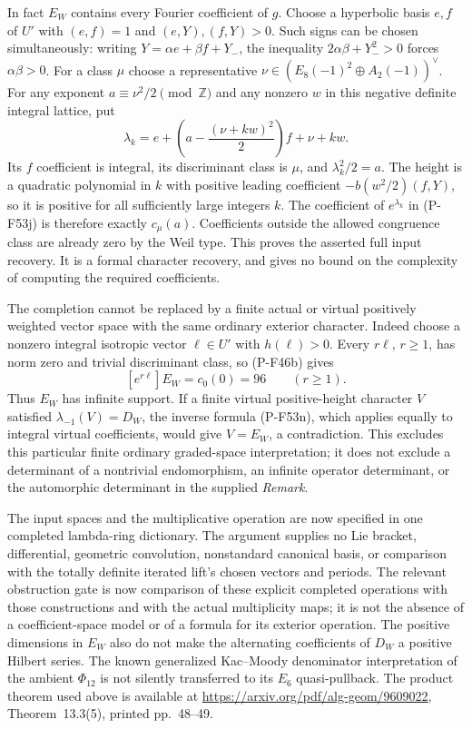 \documentclass[11pt,a4paper]{article}
\begin{document}
In fact $E_W$ contains every Fourier coefficient of $g$.
Choose a hyperbolic basis $e,f$ of $U'$ with
$(e,f)=1$ and $(e,Y),(f,Y)>0$. Such signs can be chosen
simultaneously: writing $Y=\alpha e+\beta f+Y_-$,
the inequality $2\alpha\beta+Y_-^2>0$ forces
$\alpha\beta>0$. For a class $\mu$ choose a representative
$\nu\in (E_8(-1)^2\oplus A_2(-1))^\vee$.
For any exponent $a\equiv\nu^2/2\pmod{\mathbb Z}$ and
any nonzero $w$ in this negative definite integral lattice,
put
\[
 \lambda_k=e+
       \left(a-\frac{(\nu+kw)^2}{2}\right)f+\nu+kw.
 \tag{P-F53o}
\]
Its $f$ coefficient is integral, its discriminant class
is $\mu$, and $\lambda_k^2/2=a$.
The height is a quadratic polynomial in $k$ with positive
leading coefficient $-b(w^2/2)(f,Y)$, so it is positive
for all sufficiently large integers $k$.
The coefficient of $e^{\lambda_k}$ in (P-F53j) is
therefore exactly $c_\mu(a)$. Coefficients outside the
allowed congruence class are already zero by the Weil type.
This proves the asserted full input recovery. It is a
formal character recovery, and gives no bound on the
complexity of computing the required coefficients.

The completion cannot be replaced by a finite actual
or virtual positively weighted vector space with the
same ordinary exterior character. Indeed choose a
nonzero integral isotropic vector $\ell\in U'$ with
$h(\ell)>0$. Every $r\ell$, $r\ge1$, has norm zero
and trivial discriminant class, so (P-F46b) gives
\[
       [e^{r\ell}]E_W=c_0(0)=96\qquad(r\ge1).
 \tag{P-F53p}
\]
Thus $E_W$ has infinite support. If a finite virtual
positive-height character $V$ satisfied
$\lambda_{-1}(V)=D_W$, the inverse formula (P-F53n),
which applies equally to integral virtual coefficients,
would give $V=E_W$, a contradiction. This excludes this
particular finite ordinary graded-space interpretation;
it does not exclude a determinant of a nontrivial
endomorphism, an infinite operator determinant, or the
automorphic determinant in the supplied \emph{Remark}.

The input spaces and the multiplicative operation are
now specified in one completed lambda-ring dictionary.
The argument supplies no Lie bracket, differential,
geometric convolution, nonstandard canonical basis,
or comparison with the totally definite iterated lift's
chosen vectors and periods. The relevant obstruction
gate is now comparison of these explicit completed
operations with those constructions and with the
actual multiplicity maps; it is not the absence of a
coefficient-space model or of a formula for its exterior
operation. The positive dimensions in $E_W$ also do not
make the alternating coefficients of $D_W$ a positive
Hilbert series. The known generalized Kac--Moody
denominator interpretation of the ambient $\Phi_{12}$
is not silently transferred to its $E_6$ quasi-pullback.
The product theorem used above is available at
\url{https://arxiv.org/pdf/alg-geom/9609022},
Theorem~13.3(5), printed pp.~48--49.
\end{document}
